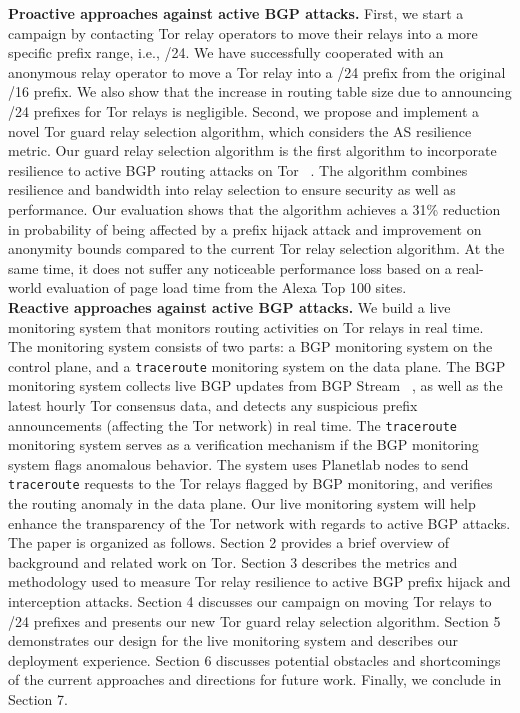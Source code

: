 \textbf{Proactive approaches against active BGP attacks.} First, we start a campaign by contacting Tor relay operators to move their relays into a more specific prefix range, i.e., /24. We have successfully cooperated with an anonymous relay operator to move a Tor relay into a /24 prefix from the original /16 prefix. We also show that the increase in routing table size due to announcing /24 prefixes for Tor relays is negligible. Second, we propose and implement a novel Tor guard relay selection algorithm, which considers the AS resilience metric. Our guard relay selection algorithm is the first algorithm to incorporate resilience to active BGP routing attacks on Tor ~\cite{sun2015raptor}. The algorithm combines resilience and bandwidth into relay selection to ensure security as well as performance. Our evaluation shows that the algorithm achieves a 31\% reduction in probability of being affected by a prefix hijack attack and improvement on anonymity bounds compared to the current Tor relay selection algorithm. At the same time, it does not suffer any noticeable performance loss based on a real-world evaluation of page load time from the Alexa Top 100 sites. 
\\
\textbf{Reactive approaches against active BGP attacks.} We build a live monitoring system that monitors routing activities on Tor relays in real time. The monitoring system consists of two parts: a BGP monitoring system on the control plane, and a {\tt traceroute} monitoring system on the data plane. The BGP monitoring system collects live BGP updates from BGP Stream ~\cite{bgpstream}, as well as the latest hourly Tor consensus data, and detects any suspicious prefix announcements (affecting the Tor network) in real time. The {\tt traceroute} monitoring system serves as a verification mechanism if the BGP monitoring system flags anomalous behavior. The system uses Planetlab nodes to send {\tt traceroute} requests to the Tor relays flagged by BGP monitoring, and verifies the routing anomaly in the data plane. Our live monitoring system will help enhance the transparency of the Tor network with regards to active BGP attacks.
\\
The paper is organized as follows. Section 2 provides a brief overview of background and related work on Tor.  Section 3 describes the metrics and methodology used to measure Tor relay resilience to active BGP prefix hijack and interception attacks. Section 4 discusses our campaign on moving Tor relays to /24 prefixes and presents our new Tor guard relay selection algorithm. Section 5 demonstrates our design for the live monitoring system and describes our deployment experience. Section 6 discusses potential obstacles and shortcomings of the current approaches and directions for future work. Finally, we conclude in Section 7. 
